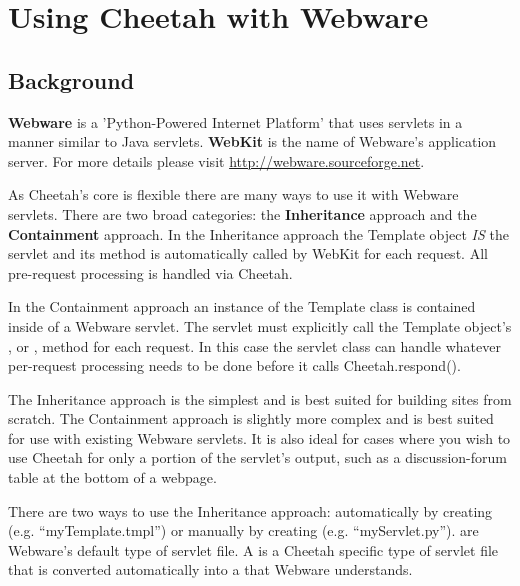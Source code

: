 \section{Using Cheetah with Webware}
\label{webware}

\subsection{Background}
\label{webware.background}

{\bf Webware} is a 'Python-Powered Internet Platform' that uses servlets in a
manner similar to Java servlets.  {\bf WebKit} is the name of Webware's
application server.  For more details please visit
\url{http://webware.sourceforge.net}.

As Cheetah's core is flexible there are many ways to use it with Webware
servlets.  There are two broad categories: the {\bf Inheritance} approach and
the {\bf Containment} approach.  In the Inheritance approach the Template object
{\em IS} the servlet and its  method is automatically called by
WebKit for each request.  All pre-request processing is handled via Cheetah.

In the Containment approach an instance of the Template class is contained
inside of a Webware servlet.  The servlet must explicitly call the Template
object's , or , method for each request.  In
this case the servlet class can handle whatever per-request processing needs to
be done before it calls Cheetah.respond().

The Inheritance approach is the simplest and is best suited for building sites
from scratch. The Containment approach is slightly more complex and is best
suited for use with existing Webware servlets.  It is also ideal for cases where
you wish to use Cheetah for only a portion of the servlet's output, such as a
discussion-forum table at the bottom of a webpage.

There are two ways to use the Inheritance approach: automatically by creating
{\bf {}} (e.g. ``myTemplate.tmpl'') or manually by
creating {\bf {}} (e.g. ``myServlet.py'').  are Webware's default type of servlet file.  A  is a Cheetah specific type of servlet file that is converted
automatically into a  that Webware understands.

